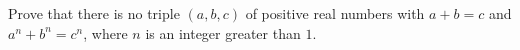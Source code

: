 Prove that there is no triple $(a,b,c)$ of positive real numbers with $a+b=c$ and $a^n+b^n=c^n$, where $n$ is an integer greater than $1$.
